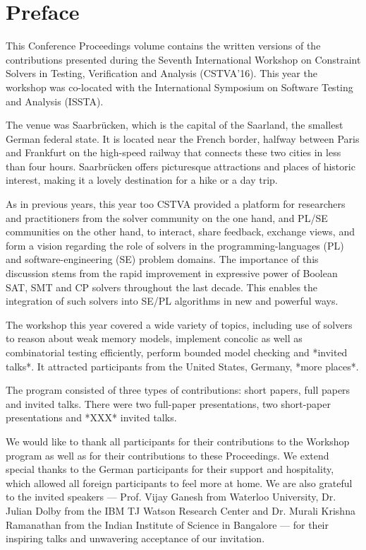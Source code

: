 \chapter*{Preface}
\setcounter{page}{1}
\pagestyle{plain}


This Conference Proceedings volume contains the written versions of the contributions presented during the Seventh International Workshop on Constraint Solvers in Testing, Verification and Analysis (CSTVA'16). This year the workshop was co-located with the International Symposium on Software Testing and Analysis (ISSTA). 

The venue was Saarbr{\"u}cken, which is the capital of the Saarland, the smallest German federal state. It is located near the French border, halfway between Paris and Frankfurt on the high-speed railway that connects these two cities in less than four hours. Saarbr{\"u}cken offers picturesque attractions and places of historic interest, making it a lovely destination for a hike or a day trip. 

As in previous years, this year too CSTVA provided a platform for researchers and practitioners from the solver community on the one hand, and PL/SE communities on the other hand, to interact, share feedback, exchange views, and form a vision regarding the role of solvers in the programming-languages (PL) and software-engineering (SE) problem domains. The importance of this discussion stems from 
the rapid improvement in expressive power of Boolean
SAT, SMT and CP solvers throughout the last decade. This enables the integration of such solvers into SE/PL algorithms in new and powerful ways.

The workshop this year covered a wide variety of topics, including use of solvers to reason about weak memory models, implement concolic as well as combinatorial testing efficiently, perform bounded model checking and *invited talks*. It attracted participants from the United States, Germany, *more places*.

The program consisted of three types of contributions: short papers, full papers and invited talks. There were two full-paper presentations, two short-paper presentations and *XXX* invited talks.

We would like to thank all participants for their contributions to the Workshop program as well as for their contributions to these Proceedings. We extend special thanks to the German participants for their support and hospitality, which allowed all foreign participants to feel more at home. We are also grateful to the invited speakers --- Prof. Vijay Ganesh from Waterloo University, Dr. Julian Dolby from the IBM TJ Watson Research Center and Dr. Murali Krishna Ramanathan from the Indian Institute of Science in Bangalore --- for their inspiring talks and unwavering acceptance of our invitation.

